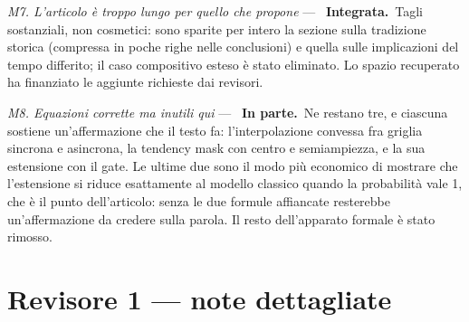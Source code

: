 \documentclass[11pt,a4paper]{article}
\newcommand{\integrata}{\textbf{Integrata.}}
\newcommand{\parziale}{\textbf{In parte.}}
\newenvironment{rilievi}
  {\begin{list}{}{%
    \setlength{\leftmargin}{1.6em}\setlength{\itemindent}{-1.6em}%
    \setlength{\itemsep}{4pt}\setlength{\parsep}{0pt}\setlength{\topsep}{4pt}}}
  {\end{list}}
\newcommand{\voce}[1]{\item \textit{#1} ---\ }
\begin{document}
\begin{rilievi}
\voce{M7. L'articolo è troppo lungo per quello che propone} \integrata\
Tagli sostanziali, non cosmetici: sono sparite per intero la sezione sulla
tradizione storica (compressa in poche righe nelle conclusioni) e quella
sulle implicazioni del tempo differito; il caso compositivo esteso è stato
eliminato. Lo spazio recuperato ha finanziato le aggiunte richieste dai
revisori.

\voce{M8. Equazioni corrette ma inutili qui} \parziale\ Ne restano tre, e
ciascuna sostiene un'affermazione che il testo fa: l'interpolazione convessa
fra griglia sincrona e asincrona, la tendency mask con centro e
semiampiezza, e la sua estensione con il gate. Le ultime due sono il modo
più economico di mostrare che l'estensione si riduce esattamente al modello
classico quando la probabilità vale 1, che è il punto dell'articolo: senza
le due formule affiancate resterebbe un'affermazione da credere sulla
parola. Il resto dell'apparato formale è stato rimosso.

\end{rilievi}

\section*{Revisore 1 --- note dettagliate}
\end{document}

